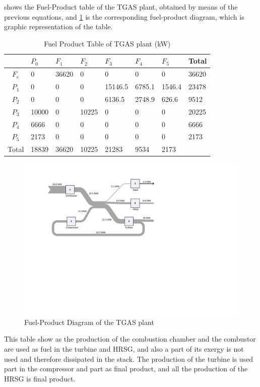 \documentclass{ecos2018}
\begin{document}
 shows the Fuel-Product table of the TGAS plant, obtained by means of the previous equations, and \cref{fig1} is the corresponding fuel-product diagram, which is graphic representation of the table.
\begin{table}[htbp]
	\caption{Fuel Product Table of TGAS plant (kW)}
	\begin{tabularx}{0.85\textwidth}{cZZZZZZZ}
		\addlinespace
		\toprule
		& $P_0$    & $F_1$    & $F_2$   & $F_3$    & $F_4$    & $F_5$    & Total \\
		\midrule
		$F_e$    & 0     & 36620 & 0     & 0       & 0      & 0      & 36620 \\
		\midrule
		$P_1$    & 0     & 0     & 0     & 15146.5 & 6785.1 & 1546.4 & 23478 \\
		$P_2$    & 0     & 0     & 0     & 6136.5  & 2748.9 & 626.6  & 9512 \\
		$P_3$    & 10000 & 0     & 10225 & 0       & 0      & 0      & 20225 \\
		$P_4$    & 6666  & 0     & 0     & 0       & 0      & 0      & 6666 \\
		$P_5$    & 2173  & 0     & 0     & 0       & 0      & 0      & 2173 \\
		\midrule
		Total & 18839 & 36620 & 10225 & 21283 & 9534  & 2173  &  \\
		\bottomrule
	\end{tabularx}
	\label{tab2}
\end{table}
\begin{figure}[h!]
\includegraphics[width=0.85\linewidth]{tgasfp_exergy}
\caption{Fuel-Product Diagram of the TGAS plant}
\label{fig1}
\end{figure}
This table show as the production of the combustion chamber and the combustor are used as fuel in the turbine and HRSG, and also a part of its exergy is not used and therefore dissipated in the stack. The production of the turbine is used part in the compressor and part as final product, and all the production of the HRSG is final product.
\end{document}
